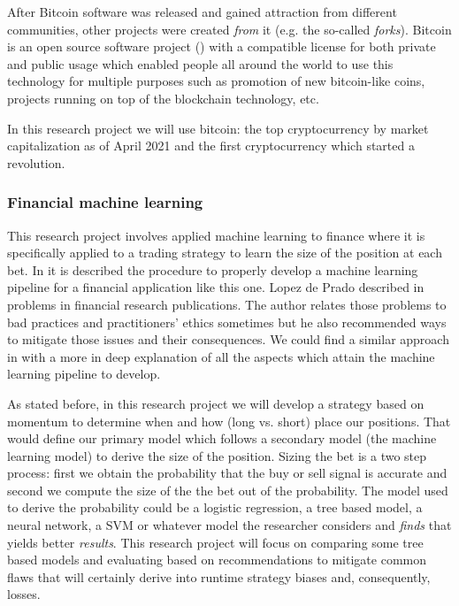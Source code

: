 After Bitcoin software was released and gained attraction from different communities, other projects were created \emph{from} it (e.g. the so-called \emph{forks}). Bitcoin is an open source software project (\cite{bitcoin_github}) with a compatible license for both private and public usage which enabled people all around the world to use this technology for multiple purposes such as promotion of new bitcoin-like coins, projects running on top of the blockchain technology, etc.

In this research project we will use bitcoin: the top cryptocurrency by market capitalization as of April 2021 and the first cryptocurrency which started a revolution.

\subsubsection{Financial machine learning}
\label{sec:intro_financial_machine_learning}

This research project involves applied machine learning to finance where it is specifically applied to a trading strategy to learn the size of the position at each bet. In \cite{lopez_de_prado} it is described the procedure to properly develop a machine learning pipeline for a financial application like this one. Lopez de Prado described in \cite{future_of_empirical_finance} problems in financial research publications. The author relates those problems to bad practices and practitioners' ethics sometimes but he also recommended ways to mitigate those issues and their consequences. We could find a similar approach in \cite{lopez_de_prado} with a more in deep explanation of all the aspects which attain the machine learning pipeline to develop.  

As stated before, in this research project we will develop a strategy based on momentum to determine when and how (long vs. short) place our positions. That would define our primary model which follows a secondary model (the machine learning model) to derive the size of the position. Sizing the bet is a two step process: first  we obtain the probability that the buy or sell signal is accurate and second we compute the size of the the bet out of the probability. The model used to derive the probability could be a logistic regression, a tree based model, a neural network, a SVM or whatever model the researcher considers and \emph{finds} that yields better \emph{results}. This research project will focus on comparing some tree based models and evaluating based on \cite{lopez_de_prado} recommendations to mitigate common flaws that will certainly derive into runtime strategy biases and, consequently, losses.

